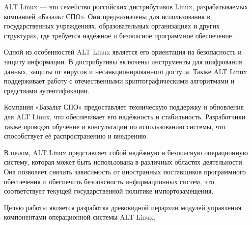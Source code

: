\documentclass[bachelor, och, pract]{SCWorks}
\begin{document}


\tableofcontents






\intro

ALT Linux — это семейство российских дистрибутивов Linux, разрабатываемых компанией «Базальт СПО».
Они предназначены для использования в государственных учреждениях, образовательных организациях и других структурах, где требуется надёжное и безопасное программное обеспечение.

Одной из особенностей ALT Linux является его ориентация на безопасность и защиту информации.
В дистрибутивы включены инструменты для шифрования данных, защиты от вирусов и несанкционированного доступа.
Также ALT Linux поддерживает работу с отечественными криптографическими алгоритмами и средствами аутентификации.

Компания «Базальт СПО» предоставляет техническую поддержку и обновления для ALT Linux, что обеспечивает его надёжность и стабильность.
Разработчики также проводят обучение и консультации по использованию системы, что способствует её распространению и внедрению.

В целом, ALT Linux представляет собой надёжную и безопасную операционную систему, которая может быть использована в различных областях деятельности.
Она позволяет снизить зависимость от иностранных поставщиков программного обеспечения и обеспечить безопасность информационных систем\cite{MSDN}, %
что соответствует текущей государственной политике импортозамещения.

Целью работы является разработка древовидной иерархии модулей управления компонентами операционной системы ALT Linux.
\end{document}
